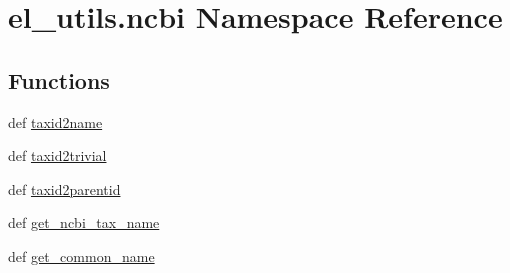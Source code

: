 \hypertarget{namespaceel__utils_1_1ncbi}{\section{el\-\_\-utils.\-ncbi Namespace Reference}
\label{namespaceel__utils_1_1ncbi}
}
\subsection*{Functions}
\begin{DoxyCompactItemize}
\item 
def \hyperlink{namespaceel__utils_1_1ncbi_a3324d8312031e2bae209ef86fc2a28ba}{taxid2name}
\item 
def \hyperlink{namespaceel__utils_1_1ncbi_a69cfaf510792797f2cc6e312443515ee}{taxid2trivial}
\item 
def \hyperlink{namespaceel__utils_1_1ncbi_aad892e1086e2664deb681062216954f9}{taxid2parentid}
\item 
def \hyperlink{namespaceel__utils_1_1ncbi_adb037b9cf58c037173904537904a1c2d}{get\-\_\-ncbi\-\_\-tax\-\_\-name}
\item 
def \hyperlink{namespaceel__utils_1_1ncbi_aaeded3ae49f56272eab82591a053937e}{get\-\_\-common\-\_\-name}
\end{DoxyCompactItemize}


